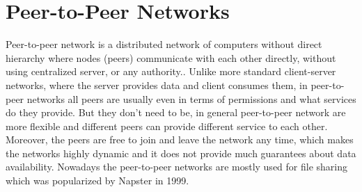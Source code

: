 \section{Peer-to-Peer Networks}
\label{sec:peer-to-peer-networks}
Peer-to-peer network is a distributed network of computers without direct hierarchy where nodes (peers) communicate with each other directly, without using centralized server, or any authority.\cite{schollmeier}.
Unlike more standard client-server networks, where the server provides data and client consumes them, in peer-to-peer networks all peers are usually even in terms of permissions and what services do they provide.
But they don't need to be, in general peer-to-peer network are more flexible and different peers can provide different service to each other.
Moreover, the peers are free to join and leave the network any time, which makes the networks highly dynamic and it does not provide much guarantees about data availability.
Nowadays the peer-to-peer networks are mostly used for file sharing which was popularized by Napster in 1999\cite{saroiu}.